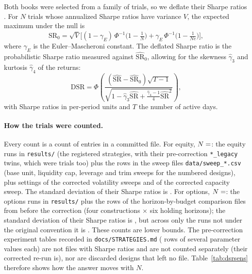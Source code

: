 \documentclass[11pt]{article}
\theoremstyle{definition}
\newcommand{\1}{\mathbf{1}}
\begin{document}
Both books were selected from a family of trials, so we deflate their Sharpe ratios \citep{BaileyLopezdePrado2014}. For $N$ trials whose annualized Sharpe ratios have variance $V$, the expected maximum under the null is
\begin{equation}
  \widehat{\mathrm{SR}}_0=\sqrt{V}\Big[(1-\gamma_E)\,\Phi^{-1}\!\big(1-\tfrac1N\big)+\gamma_E\,\Phi^{-1}\!\big(1-\tfrac{1}{Ne}\big)\Big],
\end{equation}
where $\gamma_E$ is the Euler--Mascheroni constant. The deflated Sharpe ratio is the probabilistic Sharpe ratio \citep{BaileyLopezdePrado2012} measured against $\widehat{\mathrm{SR}}_0$, allowing for the skewness $\hat\gamma_3$ and
kurtosis $\hat\gamma_4$ of the returns:
\begin{equation}
  \mathrm{DSR}=\Phi\!\left(\frac{(\widehat{\mathrm{SR}}-\widehat{\mathrm{SR}}_0)\sqrt{T-1}}{\sqrt{1-\hat\gamma_3\widehat{\mathrm{SR}}+\tfrac{\hat\gamma_4-1}{4}\widehat{\mathrm{SR}}^2}}\right),
\end{equation}
with Sharpe ratios in per-period units and $T$ the number of active days.

\paragraph{How the trials were counted.} Every count is a count of entries in a committed file. For equity, $N=\stv{trials.eq}$: the  equity runs in \texttt{results/} (the  registered strategies, with their pre-correction \texttt{*\_legacy} twins, which were trials too) plus the
 rows in the  sweep files \texttt{data/sweep\_*.csv} (base unit, liquidity cap, leverage and trim sweeps for the numbered designs), plus  settings of the corrected volatility sweeps and  of the corrected capacity sweep. The standard deviation of their Sharpe ratios is
. For options, $N=\stv{trials.op}$: the  options runs in \texttt{results/} plus the  rows of the  horizon-by-budget comparison files from before the correction (four constructions $\times$ six
holding horizons); the standard deviation of their Sharpe ratios is , but across only the  runs not under the original convention it is . These counts are lower bounds. The pre-correction experiment tables recorded in \texttt{docs/STRATEGIES.md}
( rows of several parameter values each) are not files with Sharpe ratios and are not counted separately (their corrected re-run is), nor are discarded designs that left no file. Table~\ref{tab:dsrsens} therefore shows how the answer moves with $N$.
\end{document}
